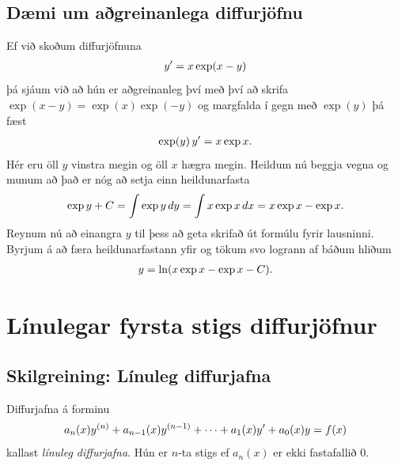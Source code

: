 \documentclass[b5paper,10pt,icelandic]{sphinxmanual}
\begin{document}
\subsection{Dæmi um aðgreinanlega diffurjöfnu}
\label{kafli08:daemi-um-agreinanlega-diffurjofnu}
Ef við skoðum diffurjöfnuna
\begin{gather}
\begin{split}y' = x\exp(x-y)\end{split}\notag
\end{gather}
þá sjáum við að hún er aðgreinanleg því með því að skrifa \(\exp(x-y) = \exp (x) \exp(-y)\) og
margfalda í gegn með \(\exp (y)\) þá fæst
\begin{gather}
\begin{split}\exp(y)\, y' = x\exp x.\end{split}\notag
\end{gather}
Hér eru öll \(y\) vinstra megin og öll \(x\) hægra megin.
Heildum nú beggja vegna og munum að það er nóg að setja einn heildunarfasta
\begin{gather}
\begin{split}\exp{y} + C = \int \exp y \, dy = \int x\exp x\, dx = x\exp x - \exp x.\end{split}\notag
\end{gather}
Reynum nú að einangra \(y\) til þess að geta skrifað út formúlu fyrir lausninni.
Byrjum á að færa heildunarfastann yfir og tökum svo logrann af báðum hliðum
\begin{gather}
\begin{split}y = \ln(x\exp x - \exp x - C).\end{split}\notag
\end{gather}

\section{Línulegar fyrsta stigs diffurjöfnur}
\label{kafli08:linulegar-fyrsta-stigs-diffurjofnur}\label{kafli08:index-2}

\subsection{Skilgreining: Línuleg diffurjafna}
\label{kafli08:skilgreining-linuleg-diffurjafna}\label{kafli08:index-3}
Diffurjafna á forminu
\begin{gather}
\begin{split}a_n(x)y^{(n)}+a_{n-1}(x)y^{(n-1)}+\cdots+a_1(x)y'+a_0(x)y=f(x)\end{split}\notag
\end{gather}
kallast \textit{línuleg diffurjafna}. Hún er \(n\)-ta stigs ef
\(a_n(x)\) er ekki fastafallið \(0\).
\end{document}
